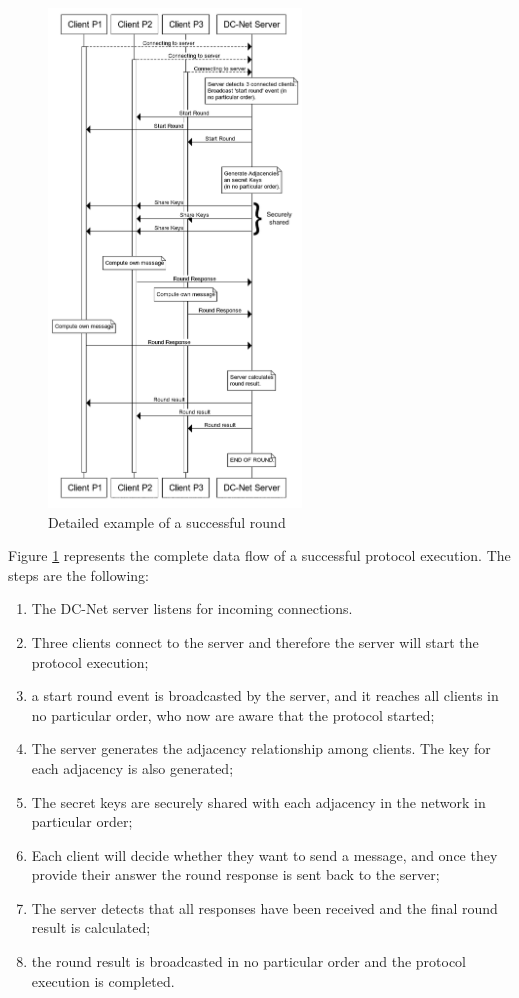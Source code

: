 \begin{figure}[H]
    \centering
    \includegraphics[width=0.6\textwidth]{Images/Design/successfulRound.png}
    \caption{Detailed example of a successful round}
    \label{fig:successfulRound}
\end{figure}

Figure \ref{fig:successfulRound} represents the complete data flow of a successful protocol execution. The steps are the following:
\begin{enumerate}
    \item The DC-Net server listens for incoming connections.
    \item Three clients connect to the server and therefore the server will start the protocol execution;
    \item a start round event is broadcasted by the server, and it reaches all clients in no particular order, who now are aware that the protocol started;
    \item The server generates the adjacency relationship among clients. The key for each adjacency is also generated;
    \item The secret keys are securely shared with each adjacency in the network in particular order;
    \item Each client will decide whether they want to send a message, and once they provide their answer the round response is sent back to the server;
    \item The server detects that all responses have been received and the final round result is calculated;
    \item the round result is broadcasted in no particular order and the protocol execution is completed.
\end{enumerate}

